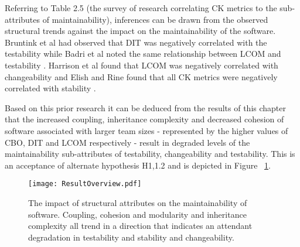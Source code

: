 Referring to Table 2.5 (the survey of research correlating CK metrics to the sub-attributes of maintainability), inferences can be drawn from the observed structural trends against the impact on the maintainability of the software. Bruntink et al had observed that DIT was negatively correlated with the testability while Badri et al noted the same relationship between LCOM and testability \citep{bruntink2006empirical} \citep{badri2011empirical}. Harrison et al found that LCOM was negatively correlated with changeability and Elish and Rine found that all CK metrics were negatively correlated with stability \citep{harrison1998investigation} \citep{elish2003investigation}.

Based on this prior research it can be deduced from the results of this chapter that the increased coupling, inheritance complexity and decreased cohesion of software associated with larger team sizes - represented by the higher values of CBO, DIT and LCOM respectively - result in degraded levels of the maintainability sub-attributes of testability, changeability and testability. This is an acceptance of alternate hypothesis H1,1.2 and is depicted in Figure ~\ref{fig:ResultOverview}.

\begin{figure}[htbp!] 
\centering    
\texttt{[image: ResultOverview.pdf]}
\caption[The impact of internal attributes on the maintainability of software.]{The impact of structural attributes on the maintainability of software. Coupling, cohesion and modularity and inheritance complexity all trend in a direction that indicates an attendant degradation in testability and stability and changeability.}
\label{fig:ResultOverview}
\end{figure} 
 
 